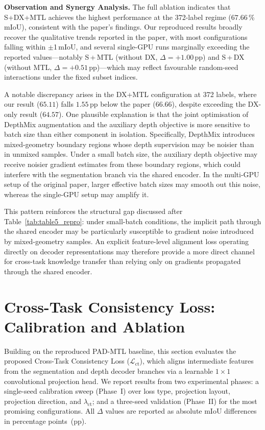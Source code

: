 \noindent
\textbf{Observation and Synergy Analysis.}
The full ablation indicates that S+DX+MTL achieves the highest performance
at the 372-label regime ($67.66$\,\% mIoU), consistent with the paper's
findings. Our reproduced results broadly recover the qualitative trends
reported in the paper, with most configurations falling within
$\pm$1\,mIoU, and several single-GPU runs marginally exceeding the
reported values---notably S\,+\,MTL (without DX, $\Delta = +1.00$\,pp)
and S\,+\,DX (without MTL, $\Delta = +0.51$\,pp)---which may reflect
favourable random-seed interactions under the fixed subset indices.

A notable discrepancy arises in the DX+MTL configuration at 372 labels,
where our result ($65.11$) falls $1.55$\,pp below the paper ($66.66$),
despite exceeding the DX-only result ($64.57$). One plausible explanation
is that the joint optimisation of DepthMix augmentation and the auxiliary
depth objective is more sensitive to batch size than either component in
isolation. Specifically, DepthMix introduces mixed-geometry boundary
regions whose depth supervision may be noisier than in unmixed samples.
Under a small batch size, the auxiliary depth objective may receive noisier
gradient estimates from these boundary regions, which could interfere with
the segmentation branch via the shared encoder. In the multi-GPU setup of
the original paper, larger effective batch sizes may smooth out this noise,
whereas the single-GPU setup may amplify it.

This pattern reinforces the structural gap discussed after
Table~\ref{tab:table5_repro}: under small-batch conditions, the implicit
path through the shared encoder may be particularly susceptible to
gradient noise introduced by mixed-geometry samples. An explicit
feature-level alignment loss operating directly on decoder
representations may therefore provide a more direct channel for
cross-task knowledge transfer than relying only on gradients propagated
through the shared encoder.

\section{Cross-Task Consistency Loss: Calibration and Ablation}
\label{sec:ct-calibration-ablation}

\noindent
Building on the reproduced PAD-MTL baseline, this section evaluates the
proposed Cross-Task Consistency Loss ($\mathcal{L}_\text{ct}$), which
aligns intermediate features from the segmentation and depth decoder
branches via a learnable $1{\times}1$ convolutional projection head.
We report results from two experimental phases: a single-seed calibration
sweep (Phase~I) over loss type, projection layout, projection direction,
and $\lambda_\text{ct}$; and a three-seed validation (Phase~II) for the
most promising configurations. All $\Delta$ values are reported as
absolute mIoU differences in percentage points~(pp).

